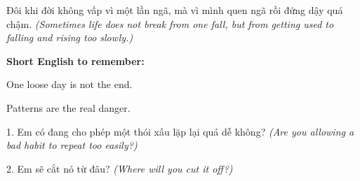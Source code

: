 \begin{baihoc}
Đôi khi đời không vấp vì một lần ngã, mà vì mình quen ngã rồi đứng dậy quá chậm.
\textit{(Sometimes life does not break from one fall, but from getting used to falling and rising too slowly.)}
\end{baihoc}

\begin{ghinhoanh}
\textbf{Short English to remember:}

One loose day is not the end.

Patterns are the real danger.
\end{ghinhoanh}

\begin{tuhocnhanh}
1. Em có đang cho phép một thói xấu lặp lại quá dễ không? \textit{(Are you allowing a bad habit to repeat too easily?)}

2. Em sẽ cắt nó từ đâu? \textit{(Where will you cut it off?)}
\end{tuhocnhanh}
\ngancach